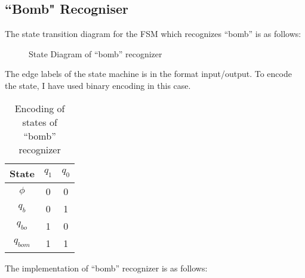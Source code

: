 \documentclass[12pt]{article}
\begin{document}
\subsection{``Bomb" Recogniser}
The state transition diagram for the FSM which recognizes ``bomb'' is as follows:
\begin{figure}[H] %
    \centering %
    \caption{State Diagram of ``bomb'' recognizer}
\end{figure}
The edge labels of the state machine is in the format input/output.
To encode the state, I have used binary encoding in this case.
\begin{table}[H]
	\centering
	\begin{tabular}{|c|c|c|}
	\hline
	\textbf{State} 	& $q_1$	& $q_0$ \\
	\hline
	$\phi$	& 0 	& 0		\\
	$q_b$	& 0 	& 1		\\
	$q_{bo}$& 1 	& 0		\\
	$q_{bom}$& 1 	& 1		\\
	\hline
	\end{tabular}
	\caption{Encoding of states of ``bomb'' recognizer}
\end{table}

The implementation of ``bomb'' recognizer is as follows:

\inputminted[bgcolor=LightGray]{vhdl}{code/bomb_recog.vhd}
\end{document}
